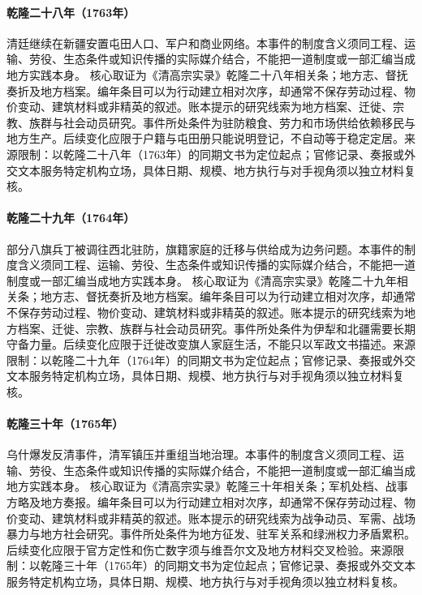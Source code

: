 \hypertarget{civic:EQ-1763-XINJIANG-SETTLEMENT}{}\paragraph{乾隆二十八年（1763年）}清廷继续在新疆安置屯田人口、军户和商业网络。本事件的制度含义须同工程、运输、劳役、生态条件或知识传播的实际媒介结合，不能把一道制度或一部汇编当成地方实践本身。 核心取证为《清高宗实录》乾隆二十八年相关条；地方志、督抚奏折及地方档案。编年条目可以为行动建立相对次序，却通常不保存劳动过程、物价变动、建筑材料或非精英的叙述。账本提示的研究线索为地方档案、迁徙、宗教、族群与社会动员研究。事件所处条件为驻防粮食、劳力和市场供给依赖移民与地方生产。后续变化应限于户籍与屯田册只能说明登记，不自动等于稳定定居。来源限制：以乾隆二十八年（1763年）的同期文书为定位起点；官修记录、奏报或外交文本服务特定机构立场，具体日期、规模、地方执行与对手视角须以独立材料复核。
\hypertarget{civic:EQ-1764-MANCHU-BANNER-RESETTLEMENT}{}\paragraph{乾隆二十九年（1764年）}部分八旗兵丁被调往西北驻防，旗籍家庭的迁移与供给成为边务问题。本事件的制度含义须同工程、运输、劳役、生态条件或知识传播的实际媒介结合，不能把一道制度或一部汇编当成地方实践本身。 核心取证为《清高宗实录》乾隆二十九年相关条；地方志、督抚奏折及地方档案。编年条目可以为行动建立相对次序，却通常不保存劳动过程、物价变动、建筑材料或非精英的叙述。账本提示的研究线索为地方档案、迁徙、宗教、族群与社会动员研究。事件所处条件为伊犁和北疆需要长期守备力量。后续变化应限于迁徙改变旗人家庭生活，不能只以军政文书描述。来源限制：以乾隆二十九年（1764年）的同期文书为定位起点；官修记录、奏报或外交文本服务特定机构立场，具体日期、规模、地方执行与对手视角须以独立材料复核。
\hypertarget{civic:EQ-1765-USH-REBELLION}{}\paragraph{乾隆三十年（1765年）}乌什爆发反清事件，清军镇压并重组当地治理。本事件的制度含义须同工程、运输、劳役、生态条件或知识传播的实际媒介结合，不能把一道制度或一部汇编当成地方实践本身。 核心取证为《清高宗实录》乾隆三十年相关条；军机处档、战事方略及地方奏报。编年条目可以为行动建立相对次序，却通常不保存劳动过程、物价变动、建筑材料或非精英的叙述。账本提示的研究线索为战争动员、军需、战场暴力与地方社会研究。事件所处条件为地方征发、驻军关系和绿洲权力矛盾累积。后续变化应限于官方定性和伤亡数字须与维吾尔文及地方材料交叉检验。来源限制：以乾隆三十年（1765年）的同期文书为定位起点；官修记录、奏报或外交文本服务特定机构立场，具体日期、规模、地方执行与对手视角须以独立材料复核。
